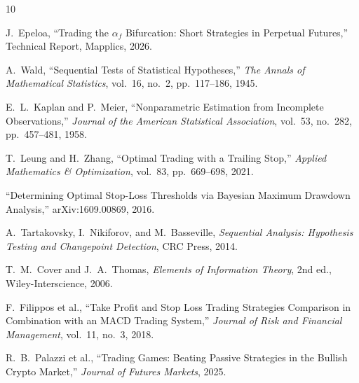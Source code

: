 \documentclass[11pt,a4paper]{article}
\begin{document}
\begin{thebibliography}{10}

J.~Epeloa,
``Trading the $\alpha_f$ Bifurcation: Short Strategies in Perpetual Futures,''
Technical Report, Mapplics, 2026.

A.~Wald,
``Sequential Tests of Statistical Hypotheses,''
\textit{The Annals of Mathematical Statistics}, vol.~16, no.~2,
pp.~117--186, 1945.

E.~L.~Kaplan and P.~Meier,
``Nonparametric Estimation from Incomplete Observations,''
\textit{Journal of the American Statistical Association}, vol.~53,
no.~282, pp.~457--481, 1958.

T.~Leung and H.~Zhang,
``Optimal Trading with a Trailing Stop,''
\textit{Applied Mathematics \& Optimization}, vol.~83,
pp.~669--698, 2021.

``Determining Optimal Stop-Loss Thresholds via Bayesian Maximum
Drawdown Analysis,''
arXiv:1609.00869, 2016.

A.~Tartakovsky, I.~Nikiforov, and M.~Basseville,
\textit{Sequential Analysis: Hypothesis Testing and Changepoint Detection},
CRC Press, 2014.

T.~M.~Cover and J.~A.~Thomas,
\textit{Elements of Information Theory}, 2nd ed.,
Wiley-Interscience, 2006.

F.~Filippos et al.,
``Take Profit and Stop Loss Trading Strategies Comparison in Combination
with an MACD Trading System,''
\textit{Journal of Risk and Financial Management}, vol.~11, no.~3, 2018.

R.~B.~Palazzi et al.,
``Trading Games: Beating Passive Strategies in the Bullish Crypto Market,''
\textit{Journal of Futures Markets}, 2025.

\end{thebibliography}
\end{document}
